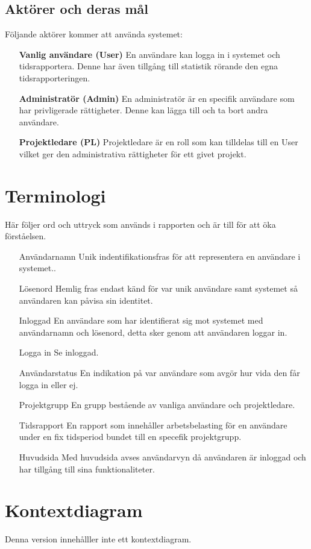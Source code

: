 \documentclass[a4paper]{article}
\begin{document}
\subsection{Aktörer och deras mål}
Följande aktörer kommer att använda systemet:
\begin{itemize}
\item [] \textbf{Vanlig användare (User)} En användare kan logga in i systemet och tidsrapportera. Denne har även tillgång till statistik rörande den egna tidsrapporteringen.
\item [] \textbf{Administratör (Admin)} En administratör är en specifik användare som har privligerade rättigheter. Denne kan lägga till och ta bort andra användare.
\item [] \textbf{Projektledare (PL)} Projektledare är en roll som kan tilldelas till en User vilket ger den administrativa rättigheter för ett givet projekt.
\end{itemize}

\section{Terminologi}
Här följer ord och uttryck som används i rapporten och är till för att öka förståelsen.
\begin{itemize}
\item [Användarnamn] Unik indentifikationsfras för att representera en användare i systemet..
\item [Lösenord] Hemlig fras endast känd för var unik användare samt systemet så användaren kan påvisa sin identitet.
\item [Inloggad] En användare som har identifierat sig mot systemet med användarnamn och lösenord, detta sker genom att användaren loggar in.
\item [Logga in] Se inloggad.
\item [Användarstatus] En indikation på var användare som avgör hur vida den får logga in eller ej.
\item [Projektgrupp] En grupp bestående av vanliga användare och projektledare.
\item [Tidsrapport] En rapport som innehåller arbetsbelasting för en användare under en fix tidsperiod bundet till en specefik projektgrupp.
\item [Huvudsida] Med huvudsida avses användarvyn då användaren är inloggad och har tillgång till sina funktionaliteter.
\end{itemize}
\section{Kontextdiagram}
Denna version innehålller inte ett kontextdiagram.
\end{document}
